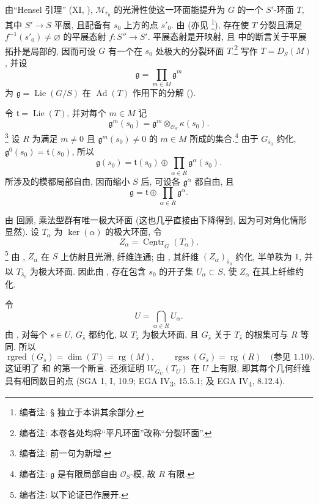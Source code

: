 由“Hensel 引理” (XI, ), \(\mathscr M_{r_0}\) 的光滑性使这一环面能提升为 \(G\) 的一个 \(S'\)-环面 \(T\), 其中 \(S'\to S\) 平展, 且配备有 \(s_0\) 上方的点 \(s'_0\). 由 (亦见 \footnote{编者注: § 独立于本讲其余部分.}), 存在使 \(T\) 分裂且满足 \(f^{-1}(s'_0)\ne\varnothing\) 的平展态射 \(f\colon S''\to S'\). 平展态射是开映射, 且 \textup{} 中的断言关于平展拓扑是局部的, 因而可设 \(G\) 有一个在 \(s_0\) 处极大的分裂环面 \(T\).\footnote{编者注: 本卷各处均将“平凡环面”改称“分裂环面”.} 写作 \(T=D_S(M)\), 并设
\[
  \mathfrak g=\prod_{m\in M}\mathfrak g^{m}
\]
为 \(\mathfrak g=\operatorname{Lie}(G/S)\) 在 \(\operatorname{Ad}(T)\) 作用下的分解 ().

令 \(\mathfrak t=\operatorname{Lie}(T)\), 并对每个 \(m\in M\) 记
\[
  \mathfrak g^{m}(s_0)
  =
  \mathfrak g^{m}\otimes_{\mathcal O_S}\kappa(s_0).
\]
\footnote{编者注: 前一句为新增.}
设 \(R\) 为满足 \(m\ne0\) 且 \(\mathfrak g^{m}(s_0)\ne0\) 的 \(m\in M\) 所成的集合.\footnote{编者注: \(\mathfrak g\) 是有限局部自由 \(\mathcal O_S\)-模, 故 \(R\) 有限.}
由于 \(G_{\bar s_0}\) 约化, \(\mathfrak g^{0}(s_0)=\mathfrak t(s_0)\), 所以
\[
  \mathfrak g(s_0)
  =
  \mathfrak t(s_0)
  \oplus
  \prod_{\alpha\in R}\mathfrak g^{\alpha}(s_0).
\]
所涉及的模都局部自由, 因而缩小 \(S\) 后, 可设各 \(\mathfrak g^{\alpha}\) 都自由, 且
\[
  \mathfrak g
  =
  \mathfrak t
  \oplus
  \prod_{\alpha\in R}\mathfrak g^{\alpha}.
\]

由 回顾, 乘法型群有唯一极大环面 (这也几乎直接由下降得到, 因为可对角化情形显然). 设 \(T_\alpha\) 为 \(\ker(\alpha)\) 的极大环面, 令
\[
  Z_\alpha=\underline{\operatorname{Centr}}_G(T_\alpha).
\]
\footnote{编者注: 以下论证已作展开.}
由 , \(Z_\alpha\) 在 \(S\) 上仿射且光滑, 纤维连通; 由 , 其纤维 \((Z_\alpha)_{\bar s_0}\) 约化, 半单秩为 \(1\), 并以 \(T_{\bar s_0}\) 为极大环面. 因此由 , 存在包含 \(s_0\) 的开子集 \(U_\alpha\subset S\), 使 \(Z_\alpha\) 在其上纤维约化.

令
\[
  U=\bigcap_{\alpha\in R}U_\alpha.
\]
由 , 对每个 \(s\in U\), \(G_{\bar s}\) 都约化, 以 \(T_{\bar s}\) 为极大环面, 且 \(G_{\bar s}\) 关于 \(T_{\bar s}\) 的根集可与 \(R\) 等同. 所以
\[
  \operatorname{rgred}(G_{\bar s})
  =
  \dim(T)
  =
  \operatorname{rg}(M),
  \qquad
  \operatorname{rgss}(G_{\bar s})
  =
  \operatorname{rg}(R)
  \quad\text{(参见 1.10).}
\]
这证明了 \textup{} 和 \textup{} 的第一个断言. 还须证明 \(W_{G_U}(T_U)\) 在 \(U\) 上有限, 即其每个几何纤维具有相同数目的点 (SGA 1, I, 10.9; EGA IV\textsubscript{3}, 15.5.1; 及 EGA IV\textsubscript{4}, 8.12.4).

